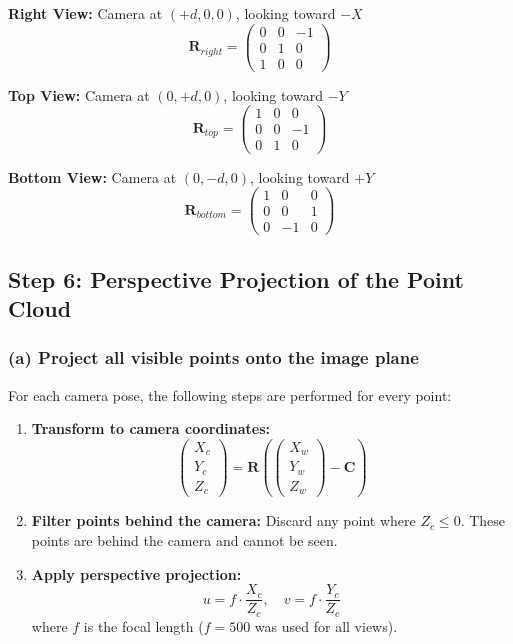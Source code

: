 \documentclass[12pt]{article}
\begin{document}
\textbf{Right View:} Camera at $(+d, 0, 0)$, looking toward $-X$
\[
\mathbf{R}_{right} = \begin{pmatrix} 0 & 0 & -1 \\ 0 & 1 & 0 \\ 1 & 0 & 0 \end{pmatrix}
\]

\textbf{Top View:} Camera at $(0, +d, 0)$, looking toward $-Y$
\[
\mathbf{R}_{top} = \begin{pmatrix} 1 & 0 & 0 \\ 0 & 0 & -1 \\ 0 & 1 & 0 \end{pmatrix}
\]

\textbf{Bottom View:} Camera at $(0, -d, 0)$, looking toward $+Y$
\[
\mathbf{R}_{bottom} = \begin{pmatrix} 1 & 0 & 0 \\ 0 & 0 & 1 \\ 0 & -1 & 0 \end{pmatrix}
\]

\subsection*{Step 6: Perspective Projection of the Point Cloud}

\subsubsection*{(a) Project all visible points onto the image plane}

For each camera pose, the following steps are performed for every point:

\begin{enumerate}
    \item \textbf{Transform to camera coordinates:}
    \[
    \begin{pmatrix} X_c \\ Y_c \\ Z_c \end{pmatrix} = \mathbf{R} \left( \begin{pmatrix} X_w \\ Y_w \\ Z_w \end{pmatrix} - \mathbf{C} \right)
    \]
    
    \item \textbf{Filter points behind the camera:} Discard any point where $Z_c \leq 0$. These points are behind the camera and cannot be seen.
    
    \item \textbf{Apply perspective projection:}
    \begin{equation}
        u = f \cdot \frac{X_c}{Z_c}, \quad v = f \cdot \frac{Y_c}{Z_c}
    \end{equation}
    where $f$ is the focal length ($f = 500$ was used for all views).
\end{enumerate}
\end{document}
